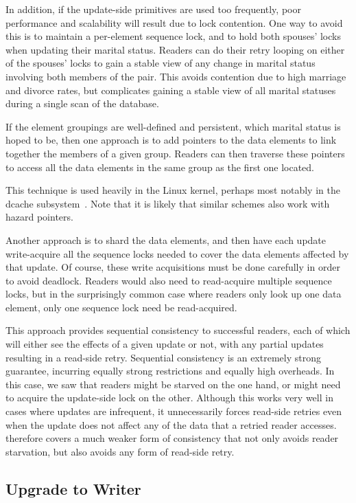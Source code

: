 In addition, if the update-side primitives are used too frequently,
poor performance and scalability will result due to lock contention.
One way to avoid this is to maintain a per-element sequence lock,
and to hold both spouses' locks when updating their marital status.
Readers can do their retry looping on either of the spouses' locks
to gain a stable view of any change in marital status involving both
members of the pair.
This avoids contention due to high marriage and divorce rates, but
complicates gaining a stable view of all marital statuses during a
single scan of the database.

If the element groupings are well-defined and persistent, which marital
status is hoped to be,
then one approach is to add pointers to the data elements to link
together the members of a given group.
Readers can then traverse these pointers to access all the data elements
in the same group as the first one located.

This technique is used heavily in the Linux kernel, perhaps most
notably in the dcache subsystem~\cite{NeilBrown2015RCUwalk}.
Note that it is likely that similar schemes also work with hazard
pointers.

Another approach is to shard the data elements, and then have each update
write-acquire all the sequence locks needed to cover the data elements
affected by that update.
Of course, these write acquisitions must be done carefully in order to
avoid deadlock.
Readers would also need to read-acquire multiple sequence locks, but
in the surprisingly common case where readers only look up one data
element, only one sequence lock need be read-acquired.

This approach provides sequential consistency to successful readers,
each of which will either see the effects of a given update or not,
with any partial updates resulting in a read-side retry.
Sequential consistency is an extremely strong guarantee, incurring equally
strong restrictions and equally high overheads.
In this case, we saw that readers might be starved on the one hand, or
might need to acquire the update-side lock on the other.
Although this works very well in cases where updates are infrequent,
it unnecessarily forces read-side retries even when the update does not
affect any of the data that a retried reader accesses.
 therefore covers a much weaker form
of consistency that not only avoids reader starvation, but also avoids
any form of read-side retry.

\subsection{Upgrade to Writer}
\label{sec:together:Upgrade to Writer}

